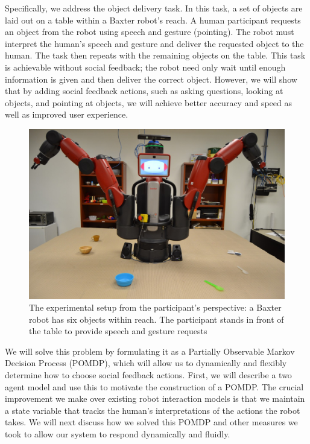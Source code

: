 \documentclass{article}
\begin{document}
\begin{multicols}{2}
Specifically, we address the object delivery task. In this task, a set of objects are laid out on a table within a Baxter robot's reach. A human participant requests an object from the robot using speech and gesture (pointing). The robot must interpret the human's speech and gesture and deliver the requested object to the human. The task then repeats with the remaining objects on the table. This task is achievable without social feedback; the robot need only wait until enough information is given and then deliver the correct object. However, we will show that by adding social feedback actions, such as asking questions, looking at objects, and pointing at objects, we will achieve better accuracy and speed as well as improved user experience. 

\begin{figure}[H]
	\begin{center}
		\includegraphics[scale=0.17]{firstPerson}
		\caption{The experimental setup from the participant's perspective: a Baxter robot has six objects within reach. The participant stands in front of the table to provide speech and gesture requests}
	\end{center}
\end{figure}

We will solve this problem by formulating it as a Partially Observable Markov Decision Process (POMDP)\citep{kaelbling99}, which will allow us to dynamically and flexibly determine how to choose social feedback actions. First, we will describe a two agent model and use this to motivate the construction of a POMDP. The crucial improvement we make over existing robot interaction models is that we maintain a state variable that tracks the human's interpretations of the actions the robot takes. We will next discuss how we solved this POMDP and other measures we took to allow our system to respond dynamically and fluidly. 


\end{multicols}
\end{document}

